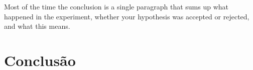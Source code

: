 

Most of the time the conclusion is a single paragraph that sums up what happened in the experiment, whether your hypothesis was accepted or rejected, and what this means.


\section{Conclusão}



